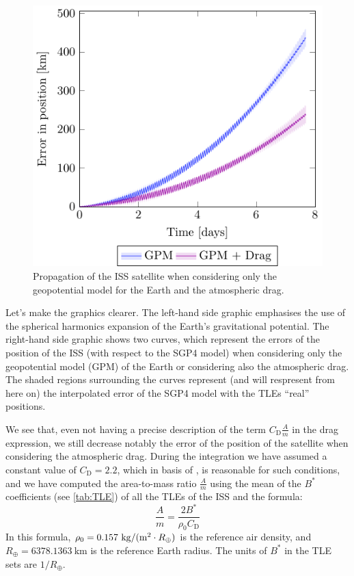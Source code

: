\documentclass[../main.tex]{subfiles}
\begin{document}
\begin{figure}[htbp]
\begin{minipage}[ht]{0.45\textwidth}
    \includegraphics[width=\textwidth]{Images/simulation/ISS.pdf}
    \caption{Propagation of the ISS satellite when considering only the geopotential model for the Earth and the atmospheric drag.}
    \label{fig:ISS}
  \end{minipage}
\end{figure}

Let's make the graphics clearer. The left-hand side graphic emphasises the use of the spherical harmonics expansion of the Earth's gravitational potential. The right-hand side graphic shows two curves, which represent the errors of the position of the ISS (with respect to the SGP4 model) when considering only the geopotential model (GPM) of the Earth or considering also the atmospheric drag. The shaded regions surrounding the curves represent (and will respresent from here on) the interpolated error of the SGP4 model with the TLEs ``real'' positions.

We see that, even not having a precise description of the term $C_\mathrm{D}\frac{A}{m}$ in the drag expression, we still decrease notably the error of the position of the satellite when considering the atmospheric drag. During the integration we have assumed a constant value of $C_\mathrm{D}=2.2$, which in basis of \cite{montenbruck}, is reasonable for such conditions, and we have computed the area-to-mass ratio $\frac{A}{m}$ using the mean of the $B^*$ coefficients (see \cref{tab:TLE}) of all the TLEs of the ISS and the formula:
\begin{equation}
  \frac{A}{m}=\frac{2 B^*}{\rho_0 C_\mathrm{D}}
\end{equation}
In this formula, $\rho_0=0.157\ \mathrm{kg}/(\mathrm{m}^2 \cdot R_\oplus)$ is the reference air density, and $R_\oplus=6378.1363\ \mathrm{km}$ is the reference Earth radius. The units of $B^*$ in the TLE sets are $1 / R_\oplus$.
\end{document}

